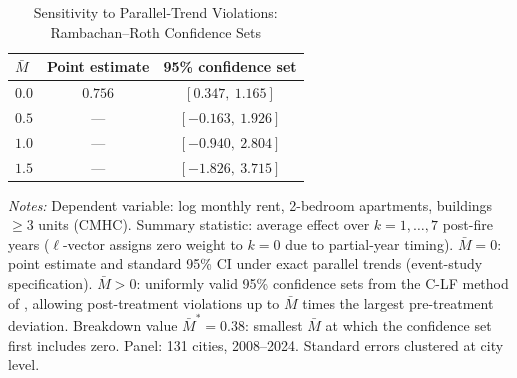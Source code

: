 \begin{table}[htbp]
   \caption{\label{tab:rambachan_roth} Sensitivity to Parallel-Trend Violations: Rambachan--Roth Confidence Sets}
   \bigskip
   \centering\small
   \begin{threeparttable}
      \begin{tabular}{lcc}
         \toprule
         $\bar{M}$ & Point estimate & 95\% confidence set \\
         \midrule
      $0.0$ & $0.756$ & $[0.347,\ 1.165]$ \\
      $0.5$ & ---     & $[-0.163,\ 1.926]$ \\
      $1.0$ & ---     & $[-0.940,\ 2.804]$ \\
      $1.5$ & ---     & $[-1.826,\ 3.715]$ \\
         \bottomrule
      \end{tabular}
      \begin{tablenotes}\footnotesize
         \item \textit{Notes:} Dependent variable: log monthly rent,
           2-bedroom apartments, buildings $\geq 3$ units (CMHC).
           Summary statistic: average effect over $k=1,\ldots,7$ post-fire
           years ($\ell$-vector assigns zero weight to $k=0$ due to
           partial-year timing). $\bar{M}=0$: point estimate and standard
           95\% CI under exact parallel trends (event-study specification).
           $\bar{M}>0$: uniformly valid 95\% confidence sets from the
           C-LF method of \citealt{rambachan2023}, allowing post-treatment
           violations up to $\bar{M}$ times the largest pre-treatment
           deviation. Breakdown value $\bar{M}^{*}=
0.38$: smallest $\bar{M}$ at which the
           confidence set first includes zero. Panel: 131 cities,
           2008--2024. Standard errors clustered at city level.
      \end{tablenotes}
   \end{threeparttable}
\end{table}
